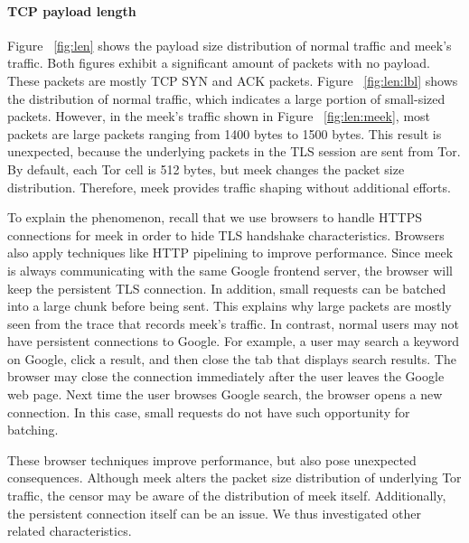 \documentclass[conference]{IEEEtran}
\begin{document}
\paragraph{TCP payload length}
Figure ~\ref{fig:len} shows the payload size distribution of normal traffic and meek's traffic. Both
figures exhibit a significant amount of packets with no payload. These packets are mostly TCP SYN and ACK
packets. Figure ~\ref{fig:len:lbl} shows the distribution of normal traffic, which indicates a large portion
of small-sized packets. However, in the meek's traffic shown in Figure ~\ref{fig:len:meek}, most packets
are large packets ranging from 1400 bytes to 1500 bytes. This result is unexpected, because the underlying packets 
in the TLS session are sent from Tor. By default, each Tor cell is 512 bytes, but meek changes the packet size 
distribution. Therefore, meek provides traffic shaping without additional efforts.

To explain the phenomenon, recall that we use browsers to handle HTTPS connections for meek in order
to hide TLS handshake characteristics.
Browsers also apply techniques like HTTP pipelining to improve performance. Since meek is always communicating with
the same Google frontend server, the browser will keep the persistent TLS connection. In addition, small requests 
can be batched into a large chunk before being sent. This explains why large packets are mostly seen from the trace that
records meek's traffic.
In contrast, normal users may not have persistent connections to Google. For example, a user may search a keyword on
Google, click a result, and then close the tab that displays search results. The browser may close the 
connection immediately after the user leaves the Google web page. Next time the user browses Google search, the browser 
opens a new connection. In this case, small requests do not have such opportunity for batching.

These browser techniques improve performance, but also pose unexpected consequences. 
Although meek alters the packet size distribution of underlying Tor traffic, 
the censor may be aware of the distribution of meek itself. 
Additionally, the persistent connection itself can be an issue.
We thus investigated other related characteristics.
\end{document}
